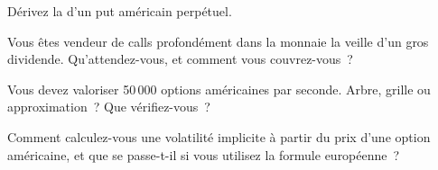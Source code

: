 \begin{interviewq}\label{iq:dv:american-options-and-early-exercise:3}
Dérivez la  d'un put américain perpétuel.
\end{interviewq}

\begin{interviewq}\label{iq:dv:american-options-and-early-exercise:4}
Vous êtes vendeur de calls profondément dans la monnaie la veille d'un gros dividende. Qu'attendez-vous,
et comment vous couvrez-vous~?
\end{interviewq}

\begin{interviewq}\label{iq:dv:american-options-and-early-exercise:5}
Vous devez valoriser 50\,000 options américaines par seconde. Arbre, grille ou approximation~? Que
vérifiez-vous~?
\end{interviewq}

\begin{interviewq}\label{iq:dv:american-options-and-early-exercise:6}
Comment calculez-vous une volatilité implicite à partir du prix d'une option américaine, et que se passe-t-il
si vous utilisez la formule européenne~?
\end{interviewq}
